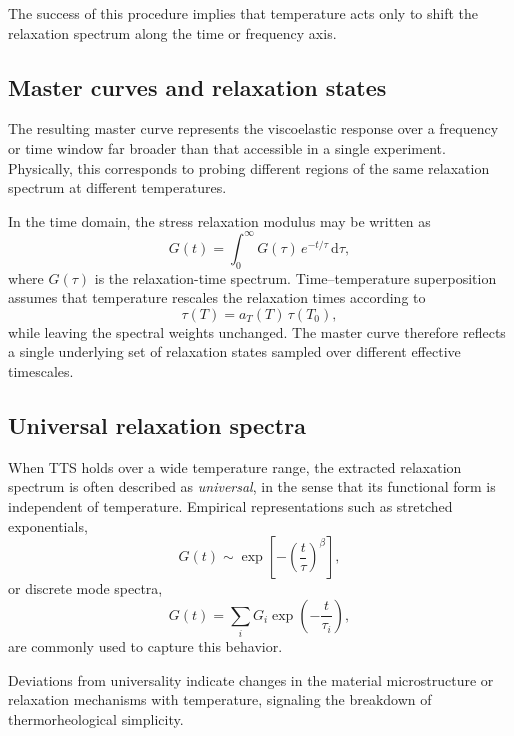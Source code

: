 The success of this procedure implies that temperature acts only to shift the relaxation spectrum along the time or frequency axis.

\subsection{Master curves and relaxation states}

The resulting master curve represents the viscoelastic response over a frequency or time window far broader than that accessible in a single experiment. Physically, this corresponds to probing different regions of the same relaxation spectrum at different temperatures.

In the time domain, the stress relaxation modulus may be written as
\begin{equation}
G(t) = \int_0^\infty G(\tau)\,e^{-t/\tau}\,\mathrm{d}\tau,
\end{equation}
where $G(\tau)$ is the relaxation-time spectrum. Time--temperature superposition assumes that temperature rescales the relaxation times according to
\begin{equation}
\tau(T) = a_T(T)\,\tau(T_0),
\end{equation}
while leaving the spectral weights unchanged. The master curve therefore reflects a single underlying set of relaxation states sampled over different effective timescales.

\subsection{Universal relaxation spectra}

When TTS holds over a wide temperature range, the extracted relaxation spectrum is often described as \emph{universal}, in the sense that its functional form is independent of temperature. Empirical representations such as stretched exponentials,
\begin{equation}
G(t) \sim \exp\!\left[-\left(\frac{t}{\tau}\right)^\beta\right],
\end{equation}
or discrete mode spectra,
\begin{equation}
G(t) = \sum_i G_i \exp\!\left(-\frac{t}{\tau_i}\right),
\end{equation}
are commonly used to capture this behavior.

Deviations from universality indicate changes in the material microstructure or relaxation mechanisms with temperature, signaling the breakdown of thermorheological simplicity.

